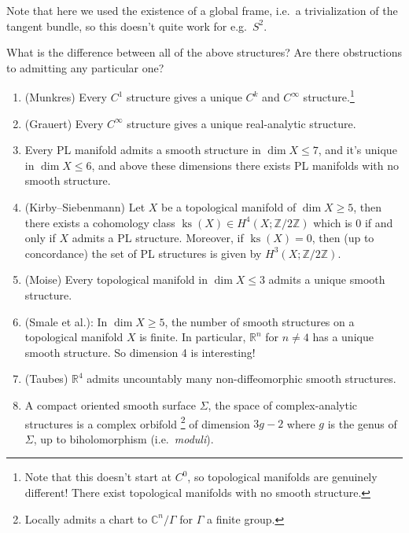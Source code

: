 \begin{remark}

Note that here we used the existence of a global frame, i.e.~a
trivialization of the tangent bundle, so this doesn't quite work for
e.g.~\(S^2\).

\end{remark}

\begin{question}

What is the difference between all of the above structures? Are there
obstructions to admitting any particular one?

\end{question}

\begin{answer}

\envlist

\begin{enumerate}
\def\labelenumi{\arabic{enumi}.}
\item
  (Munkres) Every \(C^1\) structure gives a unique \(C^k\) and
  \(C^ \infty\) structure.\footnote{Note that this doesn't start at
    \(C^0\), so topological manifolds are genuinely different! There
    exist topological manifolds with no smooth structure.}
\item
  (Grauert) Every \(C^ \infty\) structure gives a unique real-analytic
  structure.
\item
  Every PL manifold admits a smooth structure in \(\dim X \leq 7\), and
  it's unique in \(\dim X\leq 6\), and above these dimensions there
  exists PL manifolds with no smooth structure.
\item
  (Kirby--Siebenmann) Let \(X\) be a topological manifold of
  \(\dim X\geq 5\), then there exists a cohomology class
  \(\operatorname{ks}(X) \in H^4(X; {\mathbb{Z}}/2{\mathbb{Z}})\) which
  is 0 if and only if \(X\) admits a PL structure. Moreover, if
  \(\operatorname{ks}(X) = 0\), then (up to concordance) the set of PL
  structures is given by \(H^3(X; {\mathbb{Z}}/2{\mathbb{Z}})\).
\item
  (Moise) Every topological manifold in \(\dim X\leq 3\) admits a unique
  smooth structure.
\item
  (Smale et al.): In \(\dim X\geq 5\), the number of smooth structures
  on a topological manifold \(X\) is finite. In particular,
  \({\mathbb{R}}^n\) for \(n \neq 4\) has a unique smooth structure. So
  dimension 4 is interesting!
\item
  (Taubes) \({\mathbb{R}}^4\) admits uncountably many non-diffeomorphic
  smooth structures.
\item
  A compact oriented smooth surface \(\Sigma\), the space of
  complex-analytic structures is a complex orbifold \footnote{Locally
    admits a chart to \({\mathbb{C}}^n/ \Gamma\) for \(\Gamma\) a finite
    group.} of dimension \(3g-2\) where \(g\) is the genus of
  \(\Sigma\), up to biholomorphism (i.e.~\emph{moduli}).
\end{enumerate}

\end{answer}

